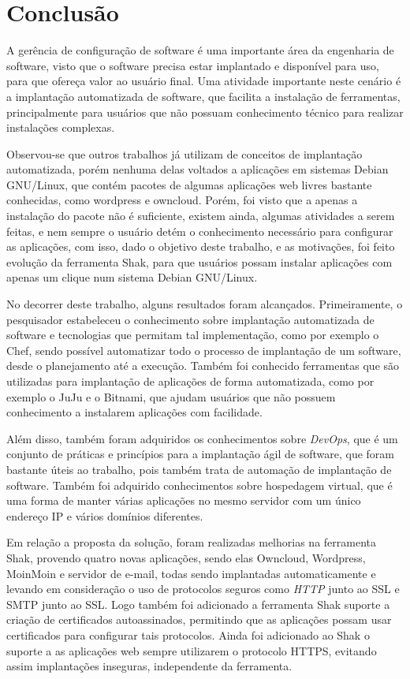 \chapter{Conclusão}
\label{cap-conclusoes}

A gerência de configuração de software é uma importante área da engenharia de software,
visto que o software precisa estar implantado e disponível para uso, para que ofereça
valor ao usuário final. Uma atividade importante neste cenário é a implantação
automatizada de software, que facilita a instalação de ferramentas, principalmente
para usuários que não possuam conhecimento técnico para realizar instalações complexas.

Observou-se que outros trabalhos já utilizam de conceitos de implantação automatizada,
porém nenhuma delas voltados a aplicações em sistemas Debian GNU/Linux, que contém
pacotes de algumas aplicações web livres bastante conhecidas, como wordpress e
owncloud. Porém, foi visto que a apenas a instalação do pacote não é suficiente,
existem ainda, algumas atividades a serem feitas, e nem sempre o usuário detém
o conhecimento necessário para configurar as aplicações, com isso, dado o objetivo
deste trabalho, e as motivações, foi feito evolução da ferramenta Shak, para
que usuários possam instalar aplicações com apenas um clique num sistema Debian
GNU/Linux.

No decorrer deste trabalho, alguns resultados foram alcançados. Primeiramente, o
pesquisador estabeleceu o conhecimento sobre implantação automatizada
de software e tecnologias que permitam tal implementação, como por exemplo o Chef,
sendo possível automatizar todo o processo de implantação de um software,
desde o planejamento até a execução. Também foi conhecido ferramentas que são
utilizadas para implantação de aplicações de forma automatizada, como por exemplo
o JuJu e o Bitnami, que ajudam usuários que não possuem conhecimento a
instalarem aplicações com facilidade.

Além disso, também foram adquiridos os conhecimentos sobre \textit{DevOps}, que é um conjunto
de práticas e princípios para a implantação ágil de software, que foram bastante
úteis ao trabalho, pois também trata de automação de implantação de software. Também
foi adquirido conhecimentos sobre hospedagem virtual, que é uma forma de manter
várias aplicações no mesmo servidor com um único endereço IP e vários domínios diferentes.

Em relação a proposta da solução, foram realizadas melhorias na ferramenta Shak,
provendo quatro novas aplicações, sendo elas Owncloud, Wordpress, MoinMoin e
servidor de e-mail, todas sendo implantadas automaticamente e
levando em consideração o uso de protocolos seguros como \textit{HTTP} junto ao SSL e SMTP
junto ao SSL. Logo também foi adicionado a
ferramenta Shak suporte a criação de certificados autoassinados, permitindo que
as aplicações possam usar certificados para configurar tais protocolos. Ainda foi
adicionado ao Shak o suporte a as aplicações web sempre utilizarem
o protocolo HTTPS, evitando assim implantações inseguras, independente da ferramenta.

